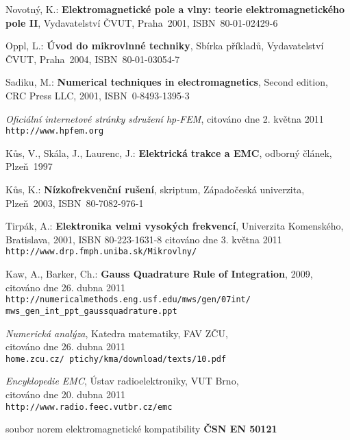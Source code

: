 
%


\begin{thebibliography}{9}
{\sc Novotný, K.:}  {\bf Elektromagnetické pole a vlny: teorie elektromagnetického pole II},
Vydavatelství ČVUT, Praha~2001, \mbox{ISBN 80-01-02429-6}

{\sc Oppl, L.:}  {\bf Úvod do mikrovlnné techniky},
Sbírka příkladů, Vydavatelství ČVUT, Praha~2004, \mbox{ISBN 80-01-03054-7}

{\sc Sadiku, M.:} {\bf Numerical techniques in electromagnetics},
Second edition, CRC Press LLC, 2001, \mbox{ISBN 0-8493-1395-3}

{\em Oficiální internetové stránky sdružení hp-FEM},
citováno dne 2. května 2011 \\
\texttt{http://www.hpfem.org}

{\sc Kůs, V., Skála, J., Laurenc, J.:}  {\bf Elektrická trakce a EMC},
odborný článek, Plzeň~1997

{\sc Kůs, K.:}  {\bf Nízkofrekvenční rušení},
skriptum, Západočeská univerzita, Plzeň~2003, \mbox{ISBN 80-7082-976-1}

{\sc Tirpák, A.:}  {\bf Elektronika velmi vysokých frekvencí}, Univerzita Komenského, Bratislava, 2001, ISBN 80-223-1631-8
citováno dne 3. května 2011 \\
\texttt{http://www.drp.fmph.uniba.sk/Mikrovlny/}

{\sc Kaw, A., Barker, Ch.:} {\bf Gauss Quadrature Rule of Integration}, 2009, \\
citováno dne 26. dubna 2011 \\
\texttt{http://numericalmethods.eng.usf.edu/mws/gen/07int/\\mws\_gen\_int\_ppt\_gaussquadrature.ppt}

{\em Numerická analýza}, Katedra matematiky, FAV ZČU,\\
citováno dne 26. dubna 2011 \\
\texttt{home.zcu.cz/~ptichy/kma/download/texts/10.pdf}

{\em Encyklopedie EMC}, Ústav radioelektroniky, VUT Brno,\\
citováno dne 20. dubna 2011 \\
\texttt{http://www.radio.feec.vutbr.cz/emc}

soubor norem elektromagnetické kompatibility  {\bf ČSN EN 50121}
\end{thebibliography}

